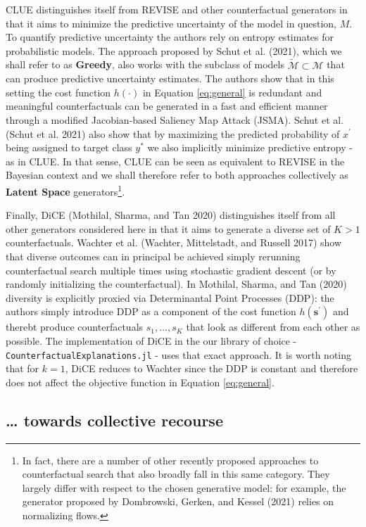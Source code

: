 \documentclass[conference,final,]{IEEEtran}
\begin{document}
CLUE distinguishes itself from REVISE and other counterfactual generators in that it aims to minimize the predictive uncertainty of the model in question, \(M\). To quantify predictive uncertainty the authors rely on entropy estimates for probabilistic models. The approach proposed by Schut et al. (2021), which we shall refer to as \textbf{Greedy}, also works with the subclass of models \(\tilde{\mathcal{M}}\subset\mathcal{M}\) that can produce predictive uncertainty estimates. The authors show that in this setting the cost function \(h(\cdot)\) in Equation \eqref{eq:general} is redundant and meaningful counterfactuals can be generated in a fast and efficient manner through a modified Jacobian-based Saliency Map Attack (JSMA). Schut et al. (Schut et al. 2021) also show that by maximizing the predicted probability of \(x^\prime\) being assigned to target class \(y^*\) we also implicitly minimize predictive entropy - as in CLUE. In that sense, CLUE can be seen as equivalent to REVISE in the Bayesian context and we shall therefore refer to both approaches collectively as \textbf{Latent Space} generators\footnote{In fact, there are a number of other recently proposed approaches to counterfactual search that also broadly fall in this same category. They largely differ with respect to the chosen generative model: for example, the generator proposed by Dombrowski, Gerken, and Kessel (2021) relies on normalizing flows.}.

Finally, DiCE (Mothilal, Sharma, and Tan 2020) distinguishes itself from all other generators considered here in that it aims to generate a diverse set of \(K>1\) counterfactuals. Wachter et al. (Wachter, Mittelstadt, and Russell 2017) show that diverse outcomes can in principal be achieved simply rerunning counterfactual search multiple times using stochastic gradient descent (or by randomly initializing the counterfactual). In Mothilal, Sharma, and Tan (2020) diversity is explicitly proxied via Determinantal Point Processes (DDP): the authors simply introduce DDP as a component of the cost function \(h(\mathbf{s}^\prime)\) and therebt produce counterfactuals \(s_1, ... , s_K\) that look as different from each other as possible. The implementation of DiCE in the our library of choice - \texttt{CounterfactualExplanations.jl} - uses that exact approach. It is worth noting that for \(k=1\), DiCE reduces to Wachter since the DDP is constant and therefore does not affect the objective function in Equation \eqref{eq:general}.

\hypertarget{towards-collective-recourse}{%
\subsection{\ldots{} towards collective recourse}\label{towards-collective-recourse}}
\end{document}
